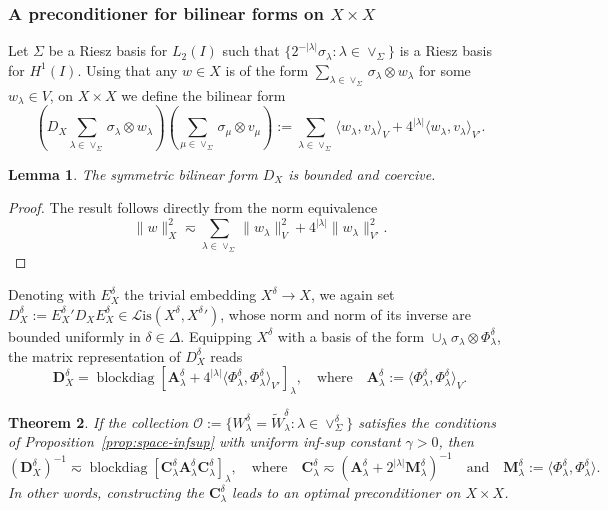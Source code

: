 \documentclass[11pt,a4paper,oneside,english]{amsart}
\numberwithin{equation}{section}
\newtheorem{theorem}{Theorem}
\numberwithin{theorem}{section}
\newtheorem{lemma}[theorem]{Lemma}
\theoremstyle{definition}
\DeclareMathOperator{\blockdiag}{blockdiag}
\newcommand{\la}{\langle}
\newcommand{\ra}{\rangle}
\newcommand{\cL}{\mathcal L}
\newcommand{\Lis}{\cL\mathrm{is}}
\newcommand{\jw}[1]{{\color{red}{JW: #1}}}
\begin{document}
\subsubsection{A preconditioner for bilinear forms on $X \times X$}
Let $\Sigma$ be a Riesz basis for $L_2(I)$ such that
$\{2^{-|\lambda|}\sigma_\lambda : \lambda \in \vee_\Sigma\}$ is a Riesz basis for $H^1(I)$.
Using that any $w \in X$ is of the form $\sum_{\lambda \in \vee_\Sigma} \sigma_\lambda \otimes w_\lambda$ for some $w_\lambda \in V$,
on $X \times X$ we define the bilinear form
\[
  (D_X \sum_{\lambda \in \vee_{\Sigma}} \sigma_\lambda \otimes w_\lambda)(\sum_{\mu \in \vee_{\Sigma}} \sigma_\mu \otimes v_\mu) := \sum_{\lambda \in \vee_\Sigma} \la w_\lambda, v_\lambda \ra_V + 4^{|\lambda|} \la w_\lambda, v_\lambda \ra_{V'}.
\]
\begin{lemma}
  The symmetric bilinear form $D_X$ is bounded and coercive.
\end{lemma}
\begin{proof}
  The result follows directly from the norm equivalence
  \[
    \|w\|_X^2 \eqsim \sum_{\lambda \in \vee_\Sigma} \|w_\lambda\|_V^2 + 4^{|\lambda|} \|w_\lambda\|_{V'}^2.
  \]
  \jw{TODO prove; hier kwamen we vorige keer niet netjes uit.}
\end{proof}
Denoting with $E_X^\delta$ the trivial embedding $X^\delta \to X$, we again set
$D_X^\delta := {E_X^\delta}' D_X E_X^\delta \in \Lis(X^\delta, {X^\delta}')$, whose
norm and norm of its inverse are bounded uniformly in $\delta \in \Delta$. Equipping
$X^\delta$ with a basis of the form $\cup_\lambda \sigma_\lambda \otimes \Phi_\lambda^\delta$,
the matrix representation of $D_X^\delta$ reads
\[
  \mathbf D_X^\delta = \blockdiag[\mathbf A_\lambda^\delta + 4^{|\lambda|} \la \Phi_\lambda^\delta, \Phi_\lambda^\delta \ra_{V'}]_\lambda, \quad \text{where} \quad \mathbf A_\lambda^\delta := \la \Phi_\lambda^\delta, \Phi_\lambda^\delta \ra_V.
\]
\begin{theorem}
If the collection $\mathcal O := \{W_\lambda^\delta = \tilde W_\lambda^\delta : \lambda \in \vee_\Sigma^\delta\}$
satisfies the conditions of Proposition~\ref{prop:space-infsup} with uniform inf-sup constant $\gamma>0$,
then
  \[
    (\mathbf D_X^\delta)^{-1} \eqsim \blockdiag[\mathbf C_\lambda^\delta \mathbf A_\lambda^\delta \mathbf C_\lambda^\delta]_\lambda, \quad \text{where} \quad \mathbf C_\lambda^\delta \eqsim (\mathbf A_\lambda^\delta + 2^{|\lambda|} \mathbf M_\lambda^\delta)^{-1} \quad \text{and} \quad \mathbf M_\lambda^\delta := \la \Phi_\lambda^\delta, \Phi_\lambda^\delta \ra.
  \]
  In other words, constructing the $\mathbf C_\lambda^\delta$ leads to an optimal preconditioner on $X \times X$.
\end{theorem}
\end{document}

